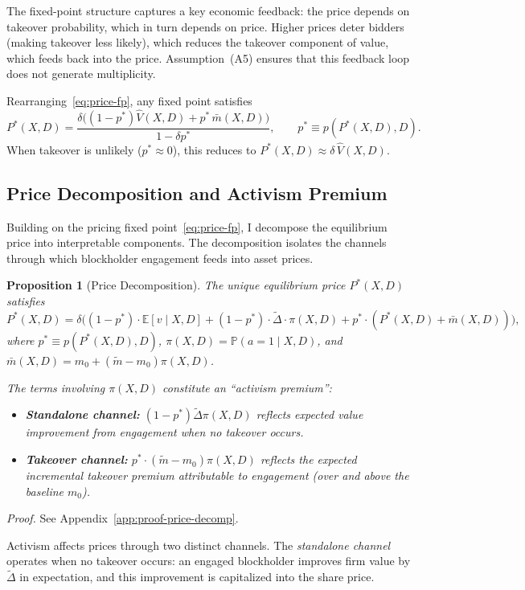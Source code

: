\documentclass[11pt]{article}
\newtheorem{proposition}{Proposition}
\newcommand{\E}{\mathbb{E}}
\newcommand{\PP}{\mathbb{P}}
\newcommand{\1}{\mathbf{1}}
\begin{document}
The fixed-point structure captures a key economic feedback: the price depends on takeover probability, which in turn depends on price. Higher prices deter bidders (making takeover less likely), which reduces the takeover component of value, which feeds back into the price. Assumption~\textup{(A5)} ensures that this feedback loop does not generate multiplicity.

Rearranging~\eqref{eq:price-fp}, any fixed point satisfies
\[
P^*(X,D)=\frac{\delta\big((1-p^*)\hat{V}(X,D)+p^*\,\bar{m}(X,D)\big)}{1-\delta p^*},
\qquad p^*\equiv p(P^*(X,D),D).
\]
When takeover is unlikely ($p^*\approx 0$), this reduces to $P^*(X,D)\approx \delta\,\hat{V}(X,D)$.

%
\subsection{Price Decomposition and Activism Premium}
%

Building on the pricing fixed point~\eqref{eq:price-fp}, I decompose the equilibrium price into interpretable components. The decomposition isolates the channels through which blockholder engagement feeds into asset prices.

\begin{proposition}[Price Decomposition]
\label{prop:price-decomp}
The unique equilibrium price $P^*(X,D)$ satisfies
\[
P^*(X,D) = \delta\Big((1-p^*) \cdot \E[v \mid X,D] + (1-p^*) \cdot \tilde{\Delta} \cdot \pi(X,D) + p^* \cdot (P^*(X,D) + \bar{m}(X,D))\Big),
\]
where $p^* \equiv p(P^*(X,D),D)$, $\pi(X,D) = \PP(a=1 \mid X,D)$, and $\bar{m}(X,D) = m_0 + (\tilde{m} - m_0)\pi(X,D)$.

The terms involving $\pi(X,D)$ constitute an ``activism premium'':
\begin{itemize}[leftmargin=1.5em,itemsep=0pt]
\item \textbf{Standalone channel:} $(1-p^*)\tilde{\Delta}\pi(X,D)$ reflects expected value improvement from engagement when no takeover occurs.
\item \textbf{Takeover channel:} $p^* \cdot (\tilde{m}-m_0)\pi(X,D)$ reflects the expected \emph{incremental} takeover premium attributable to engagement (over and above the baseline $m_0$).
\end{itemize}
\end{proposition}
\textit{Proof.} See Appendix~\ref{app:proof-price-decomp}.

Activism affects prices through two distinct channels. The \emph{standalone channel} operates when no takeover occurs: an engaged blockholder improves firm value by $\tilde{\Delta}$ in expectation, and this improvement is capitalized into the share price.
\end{document}
